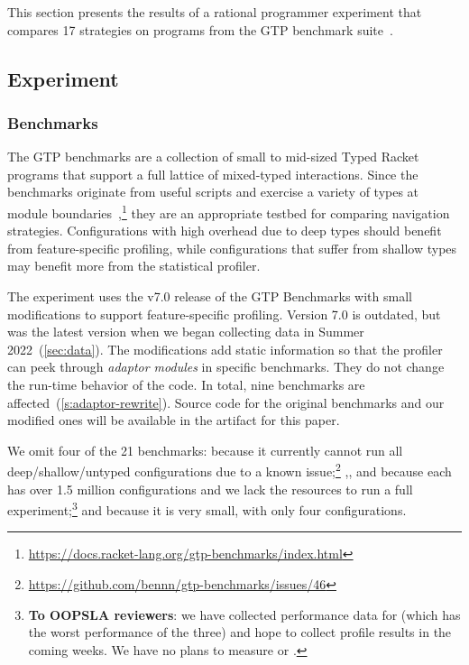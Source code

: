 \newcommand{\numgtp}{16}
\newcommand{\gtpurl}{\url{https://docs.racket-lang.org/gtp-benchmarks/index.html}}
\newcommand{\boundaryMB}{536} %
\newcommand{\statisticalMB}{4645} %
\newcommand{\runtimeMB}{44}

This section presents the results of a rational programmer
experiment that compares 17 strategies on programs from
the GTP benchmark suite~\cite{gtp-benchmarks}.


\subsection{Experiment}

\subsubsection{Benchmarks}

The GTP benchmarks are a collection of small to mid-sized Typed Racket programs
that support a full lattice of mixed-typed interactions.
Since the benchmarks originate from useful scripts
and exercise a variety of types at module boundaries~\cite{gtnffvf-jfp-2019},\footnote{\gtpurl{}}
they are an appropriate testbed for comparing navigation strategies.
Configurations with high overhead due to deep types should benefit from
feature-specific profiling, while configurations that suffer from shallow
types may benefit more from the statistical profiler.

The experiment uses the v7.0 release of the GTP Benchmarks with small modifications
to support feature-specific profiling.
Version 7.0 is outdated, but was the latest version when we began collecting
data in Summer 2022~(\cref{sec:data}).
The modifications add static information so that the profiler can peek through
\emph{adaptor modules} in specific benchmarks.
They do not change the run-time behavior of the code.
In total, nine benchmarks are affected~(\cref{s:adaptor-rewrite}).
Source code for the original benchmarks and our modified ones will be available
in the artifact for this paper.

We omit four of the 21 benchmarks:
 because it currently cannot run all deep/shallow/untyped configurations
due to a known issue;\footnote{\url{https://github.com/bennn/gtp-benchmarks/issues/46}}
,, and  because each has over 1.5
million configurations and we lack the resources to run a full experiment;\footnote{
\textbf{To OOPSLA reviewers}: we have collected performance data for
 (which has the worst performance of the three) and hope to
collect profile results in the coming weeks.  We have no plans to measure
 or .
}
and  because it is very small, with only four configurations.


